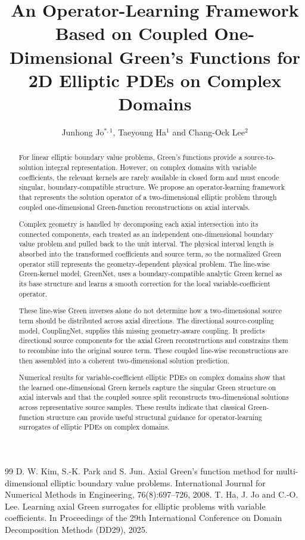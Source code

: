 \documentclass{DTE2027_abstracts}
\title{An Operator-Learning Framework Based on Coupled One-Dimensional Green's Functions for 2D Elliptic PDEs on Complex Domains}
\author{Junhong Jo$^{*,1}$, Taeyoung Ha$^{1}$ and Chang-Ock Lee$^{2}$}
\begin{document}
\begin{abstract}
For linear elliptic boundary value problems, Green's functions provide a source-to-solution integral representation. However, on complex domains with variable coefficients, the relevant kernels are rarely available in closed form and must encode singular, boundary-compatible structure. We propose an operator-learning framework that represents the solution operator of a two-dimensional elliptic problem through coupled one-dimensional Green-function reconstructions on axial intervals.

Complex geometry is handled by decomposing each axial intersection into its connected components, each treated as an independent one-dimensional boundary value problem and pulled back to the unit interval. The physical interval length is absorbed into the transformed coefficients and source term, so the normalized Green operator still represents the geometry-dependent physical problem. The line-wise Green-kernel model, GreenNet, uses a boundary-compatible analytic Green kernel as its base structure and learns a smooth correction for the local variable-coefficient operator.

These line-wise Green inverses alone do not determine how a two-dimensional source term should be distributed across axial directions. The directional source-coupling model, CouplingNet, supplies this missing geometry-aware coupling. It predicts directional source components for the axial Green reconstructions and constrains them to recombine into the original source term. These coupled line-wise reconstructions are then assembled into a coherent two-dimensional solution prediction.

Numerical results for variable-coefficient elliptic PDEs on complex domains show that the learned one-dimensional Green kernels capture the singular Green structure on axial intervals and that the coupled source split reconstructs two-dimensional solutions across representative source samples. These results indicate that classical Green-function structure can provide useful structural guidance for operator-learning surrogates of elliptic PDEs on complex domains.
\end{abstract}


\begin{thebibliography}{99}
 D. W. Kim, S.-K. Park and S. Jun. Axial Green's function method for multi-dimensional elliptic boundary value problems. International Journal for Numerical Methods in Engineering, 76(8):697--726, 2008.
 T. Ha, J. Jo and C.-O. Lee. Learning axial Green surrogates for elliptic problems with variable coefficients. In Proceedings of the 29th International Conference on Domain Decomposition Methods (DD29), 2025.
\end{thebibliography}
\end{document}
